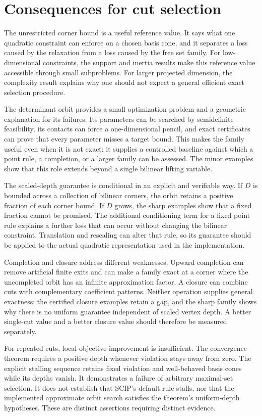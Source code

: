 \section{Consequences for cut selection}\label{disc:section}

The unrestricted corner bound is a useful reference value. It says what
one quadratic constraint can enforce on a chosen basis cone, and it
separates a loss caused by the relaxation from a loss caused by the free
set family. For low-dimensional constraints, the support and inertia
results make this reference value accessible through small subproblems.
For larger projected dimension, the complexity result explains why one
should not expect a general efficient exact selection procedure.

The determinant orbit provides a small optimization problem and a
geometric explanation for its failures. Its parameters can be searched
by semidefinite feasibility, its contacts can force a one-dimensional
pencil, and exact certificates can prove that every parameter misses a
target bound. This makes the family useful even when it is not exact:
it supplies a controlled baseline against which a point rule, a
completion, or a larger family can be assessed. The minor examples show
that this role extends beyond a single bilinear lifting variable.

The scaled-depth guarantee is conditional in an explicit and verifiable
way. If $D$ is bounded across a collection of bilinear corners, the orbit
retains a positive fraction of each corner bound. If $D$ grows, the sharp
examples show that a fixed fraction cannot be promised. The additional
conditioning term for a fixed point rule explains a further loss that
can occur without changing the bilinear constraint. Translation and
rescaling can alter that rule, so its guarantee should be applied to the
actual quadratic representation used in the implementation.

Completion and closure address different weaknesses. Upward completion
can remove artificial finite exits and can make a family exact at a
corner where the uncompleted orbit has an infinite approximation
factor. A closure can combine cuts with complementary coefficient
patterns. Neither operation supplies general exactness: the certified
closure examples retain a gap, and the sharp family shows why there is
no uniform guarantee independent of scaled vertex depth. A better
single-cut value and a better closure value should therefore be measured
separately.

For repeated cuts, local objective improvement is insufficient. The
convergence theorem requires a positive depth whenever violation stays
away from zero. The explicit stalling sequence retains fixed violation
and well-behaved basis cones while its depths vanish. It demonstrates a
failure of arbitrary maximal-set selection. It does not establish that
SCIP's default rule stalls, nor that the implemented approximate orbit
search satisfies the theorem's uniform-depth hypotheses. These are
distinct assertions requiring distinct evidence.

